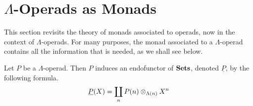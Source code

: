 \begin{rem}\label{rem:sym-vs-lam}
\end{rem}

%
%
%
%
%


\section{\texorpdfstring{$\Lambda$}{L}-Operads as Monads}\label{sec:lop-monad}

This section revisits the theory of monads associated to operads, now in the context of $\Lambda$-operads.
For many purposes, the monad associated to a $\Lambda$-operad contains all the information that is needed, as we shall see below.

\begin{Defi}\label{Defi:und-P}
Let $P$ be a $\Lambda$-operad. Then $P$ induces an endofunctor of $\mathbf{Sets}$, denoted $\underline{P}$, by the following formula.
  \[
	 \underline{P}(X) = \coprod_n P(n) \otimes_{\Lambda(n)} X^{n}
  \]
\end{Defi}

